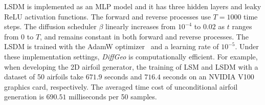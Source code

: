 LSDM is implemented as an MLP model and it has three hidden layers and leaky ReLU activation functions. The forward and reverse processes use $T=1000$ time steps. The diffusion scheduler $\beta$ linearly increases from $10^{-4}$ to $0.02$ as $t$ ranges from $0$ to $T$, and remains constant in both forward and reverse processes. The LSDM is trained with the AdamW optimizer~\cite{ai.Loshchilov2019} and a learning rate of $10^{-5}$. Under these implementation settings, \textit{DiffGeo} is computationally efficient. For example, when developing the 2D airfoil generator, the training of LSM and LSDM with a dataset of 50 airfoils take $671.9$ seconds and $716.4$ seconds on an NVIDIA V100 graphics card, respectively.
The averaged time cost of unconditional airfoil generation is $690.51$ milliseconds per 50 samples.